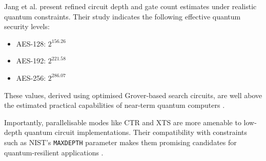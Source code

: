 Jang et al. \cite{Jang2025} present refined circuit depth and gate count estimates under realistic quantum constraints. 
Their study indicates the following effective quantum security levels:

\begin{itemize}
    \item AES-128: $2^{156.26}$
    \item AES-192: $2^{221.58}$
    \item AES-256: $2^{286.07}$
\end{itemize} 

These values, derived using optimised Grover-based search circuits, 
are well above the estimated practical capabilities of near-term quantum computers \cite{Jang2025}. 

Importantly, parallelisable modes like CTR and XTS are more amenable to low-depth quantum circuit implementations. 
Their compatibility with constraints such as NIST's \texttt{MAXDEPTH} parameter makes them promising candidates for quantum-resilient applications \cite{Jang2025}.

\begin{table}[h]
\centering
{}
\caption{Security characteristics of AES modes of operation.}
\end{table}